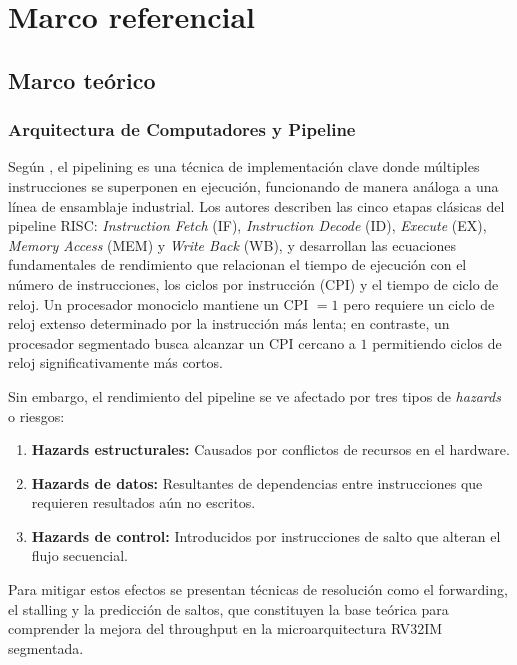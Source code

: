 \section{Marco referencial}
\label{sec:marco}

\subsection{Marco teórico}

\subsubsection{Arquitectura de Computadores y Pipeline}
Según \textcite{Patterson2017Computer}, el pipelining es una técnica de
implementación clave donde múltiples instrucciones se superponen en ejecución,
funcionando de manera análoga a una línea de ensamblaje industrial. Los autores
describen las cinco etapas clásicas del pipeline RISC: \textit{Instruction Fetch}
(IF), \textit{Instruction Decode} (ID), \textit{Execute} (EX),
\textit{Memory Access} (MEM) y \textit{Write Back} (WB), y desarrollan las
ecuaciones fundamentales de rendimiento que relacionan el tiempo de ejecución
con el número de instrucciones, los ciclos por instrucción (CPI) y el tiempo de
ciclo de reloj. Un procesador monociclo mantiene un CPI $= 1$ pero requiere un
ciclo de reloj extenso determinado por la instrucción más lenta; en contraste,
un procesador segmentado busca alcanzar un CPI cercano a $1$ permitiendo ciclos
de reloj significativamente más cortos.

Sin embargo, el rendimiento del pipeline se ve afectado por tres tipos de
\textit{hazards} o riesgos:
\begin{enumerate}
    \item \textbf{Hazards estructurales:} Causados por conflictos de recursos
          en el hardware.
    \item \textbf{Hazards de datos:} Resultantes de dependencias entre
          instrucciones que requieren resultados aún no escritos.
    \item \textbf{Hazards de control:} Introducidos por instrucciones de salto
          que alteran el flujo secuencial.
\end{enumerate}
Para mitigar estos efectos se presentan técnicas de resolución como el
forwarding, el stalling y la predicción de saltos, que constituyen la base
teórica para comprender la mejora del throughput en la microarquitectura
RV32IM segmentada.\parencite{Patterson2017Computer}



